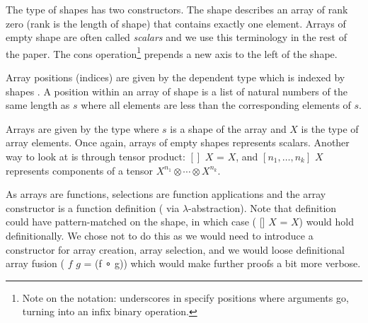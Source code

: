 
The type of shapes  has two constructors. The \AC{[]} shape describes
an array of
rank zero (rank is the length of shape) that contains exactly one
element. Arrays of empty shape are often called \emph{scalars} and we use this
terminology in the rest of the paper.
The cons operation\footnote{
Note on the notation: underscores in  specify positions where
arguments go, turning  into an infix binary operation.}%
 prepends a new axis to the left of the shape.

Array positions (indices) are given by the dependent type  which
is indexed by shapes .  A position within an array of shape 
is a list of natural numbers of the same length as $s$ where all elements
are less than the corresponding elements of $s$.

Arrays are given by the type    where $s$ is a shape of the
array and $X$ is the type of array elements. Once again, arrays of empty shapes
represents scalars.  Another way to look at  is through tensor product:
 $[]$ $X$ = $X$, and  $[n_1, \dots, n_k]$ $X$ represents
components of a tensor $X^{n_1} \otimes \cdots \otimes X^{n_k}$.  

As arrays are functions, selections are function applications and
the array constructor is a function definition (\eg{} via $\lambda$-abstraction).
Note that  definition could have pattern-matched on the shape,
in which case ( [] $X$ = $X$) would hold definitionally.
We chose not to do this as we would need to introduce a constructor
for array creation, array selection, and we would loose
definitional array fusion ( $f$   $g$ =  (f ∘ g))
which would make further proofs a bit more verbose.



